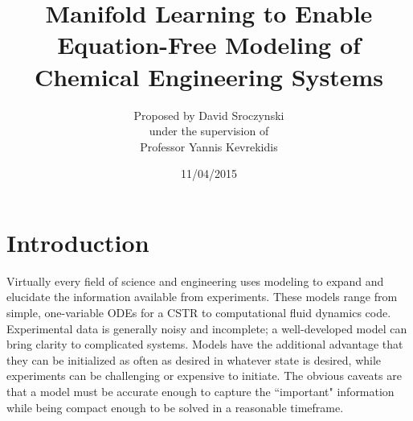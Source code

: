 \documentclass[12pt]{article}
\begin{document}
\title{Manifold Learning to Enable Equation-Free Modeling of Chemical Engineering Systems}
\author{\LARGE Proposed by David Sroczynski\vspace{3mm}\\\Large under the supervision of\vspace{3mm}\\\LARGE Professor Yannis Kevrekidis}
\date{11/04/2015}
\maketitle
\thispagestyle{empty}
\clearpage
\tableofcontents
\thispagestyle{empty}
\clearpage
{}
\section{Introduction}
Virtually every field of science and engineering uses modeling to expand and elucidate the information available from experiments. These models range from simple, one-variable ODEs for a CSTR to computational fluid dynamics code. Experimental data is generally noisy and incomplete; a well-developed model can bring clarity to complicated systems. Models have the additional advantage that they can be initialized as often as desired in whatever state is desired, while experiments can be challenging or expensive to initiate. The obvious caveats are that a model must be accurate enough to capture the ``important" information while being compact enough to be solved in a reasonable timeframe.  \vspace{1mm}
\end{document}
